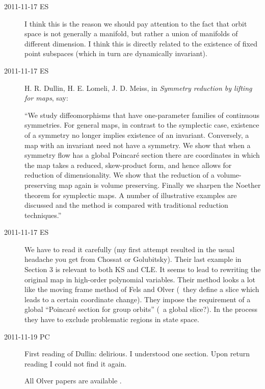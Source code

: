 \begin{description}
\item[2011-11-17 ES] I think this is the reason we should pay attention to the
fact that orbit space is not generally a manifold, but rather a union of manifolds
of different dimension. I think this is directly related to the existence of
fixed point subspaces (which in turn are dynamically invariant).


\item[2011-11-17 ES] H. R. Dullin, H. E. Lomeli, J. D. Meiss, in
\emph{Symmetry reduction by lifting for maps},
say:

``We study diffeomorphisms that have one-parameter families of continuous
symmetries. For general maps, in contrast to the symplectic case, existence of
a symmetry no longer implies existence of an invariant. Conversely, a map with
an invariant need not have a symmetry. We show that when a symmetry flow has a
global Poincar\'{e} section there are coordinates in which the map takes a
reduced, skew-product form, and hence allows for reduction of dimensionality.
We show that the reduction of a volume-preserving map again is volume
preserving. Finally we sharpen the Noether theorem for symplectic maps. A
number of illustrative examples are discussed and the method is compared with
traditional reduction techniques.''

\item[2011-11-17 ES] We have to read it carefully (my first attempt resulted in the
usual headache you get from Chossat or Golubitsky). Their last example in
Section 3 is relevant to both KS and CLE. It seems to lead to rewriting the original
map in high-order polynomial variables.
Their method looks a lot like the moving frame method of Fels and Olver 
(\ie\ they define a slice which leads to a certain coordinate change). They impose
the requirement of a global ``Poincar\'e section for group orbits'' (\ie\ a global slice?).
In the process they have to exclude problematic regions in state space.

\item[2011-11-19 PC] First reading of Dullin\etal{}: delirious. I
understood one section. Upon return reading I could not find it again.


All Olver papers are available
.


\end{description}

